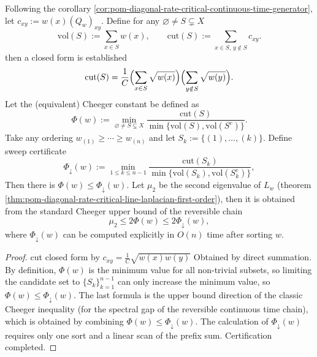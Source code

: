 \begin{corollary}\label{cor:pom-diagonal-rate-critical-cheeger-auditable-upper-bound}
Following the corollary \ref{cor:pom-diagonal-rate-critical-continuous-time-generator}, let \(c_{xy}:=w(x)(Q_w)_{xy}\).
Define for any \(\varnothing\ne S\subsetneq X\)
\[
\mathrm{vol}(S):=\sum_{x\in S}w(x),\qquad
\mathrm{cut}(S):=\sum_{x\in S,\,y\notin S}c_{xy}.
\]
then a closed form is established
\[
\mathrm{cut}(S)=\frac{1}{C}\Bigl(\sum_{x\in S}\sqrt{w(x)}\Bigr)\Bigl(\sum_{y\notin S}\sqrt{w(y)}\Bigr).
\]
Let the (equivalent) Cheeger constant be defined as
\[
\Phi(w):=\min_{\varnothing\ne S\subsetneq X}\frac{\mathrm{cut}(S)}{\min\{\mathrm{vol}(S),\mathrm{vol}(S^c)\}}.
\]
Take any ordering \(w_{(1)}\ge\cdots\ge w_{(n)}\) and let \(S_k:=\{(1),\dots,(k)\}\).
Define sweep certificate
\[
\Phi_{\downarrow}(w):=\min_{1\le k\le n-1}\frac{\mathrm{cut}(S_k)}{\min\{\mathrm{vol}(S_k),\mathrm{vol}(S_k^c)\}},
\]
Then there is \(\Phi(w)\le \Phi_{\downarrow}(w)\).
Let \(\mu_2\) be the second eigenvalue of \(L_w\) (theorem \ref{thm:pom-diagonal-rate-critical-line-laplacian-first-order}), then it is obtained from the standard Cheeger upper bound of the reversible chain
\[
\mu_2\le 2\Phi(w)\le 2\Phi_{\downarrow}(w),
\]
where \(\Phi_{\downarrow}(w)\) can be computed explicitly in \(O(n)\) time after sorting \(w\).
\end{corollary}
\begin{proof}
cut closed form by
\(
c_{xy}=\frac{1}{C}\sqrt{w(x)w(y)}
\)
Obtained by direct summation.
By definition, \(\Phi(w)\) is the minimum value for all non-trivial subsets, so limiting the candidate set to \(\{S_k\}_{k=1}^{n-1}\) can only increase the minimum value, so \(\Phi(w)\le \Phi_{\downarrow}(w)\).
The last formula is the upper bound direction of the classic Cheeger inequality (for the spectral gap of the reversible continuous time chain), which is obtained by combining \(\Phi(w)\le \Phi_{\downarrow}(w)\).
The calculation of \(\Phi_{\downarrow}(w)\) requires only one sort and a linear scan of the prefix sum. Certification completed.
\end{proof}

